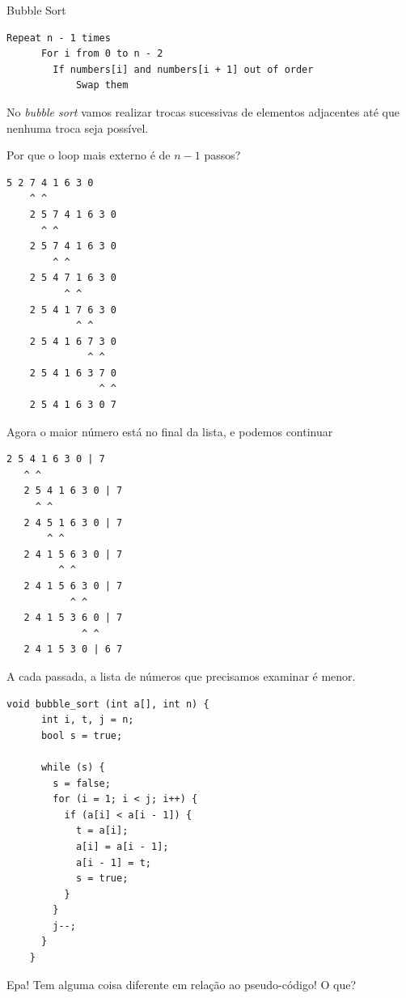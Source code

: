 \documentclass{beamer}
\begin{document}
\begin{frame}{Bubble Sort}

  \begin{lstlisting}[style=code]
    Repeat n - 1 times
      For i from 0 to n - 2
        If numbers[i] and numbers[i + 1] out of order
            Swap them
  \end{lstlisting}

  No \emph{bubble sort} vamos realizar trocas sucessivas de elementos
  adjacentes até que nenhuma troca seja possível.

  Por que o loop mais externo é de $n - 1$ passos?

  \framebreak

  \begin{lstlisting}[style=code]
    5 2 7 4 1 6 3 0
    ^ ^
    2 5 7 4 1 6 3 0
      ^ ^
    2 5 7 4 1 6 3 0
        ^ ^
    2 5 4 7 1 6 3 0
          ^ ^
    2 5 4 1 7 6 3 0
            ^ ^
    2 5 4 1 6 7 3 0
              ^ ^
    2 5 4 1 6 3 7 0
                ^ ^
    2 5 4 1 6 3 0 7
  \end{lstlisting}

  \framebreak

  Agora o maior número está no final da lista, e podemos continuar 

  \begin{lstlisting}[style=code]
   2 5 4 1 6 3 0 | 7
   ^ ^
   2 5 4 1 6 3 0 | 7
     ^ ^
   2 4 5 1 6 3 0 | 7
       ^ ^
   2 4 1 5 6 3 0 | 7
         ^ ^
   2 4 1 5 6 3 0 | 7
           ^ ^
   2 4 1 5 3 6 0 | 7
             ^ ^
   2 4 1 5 3 0 | 6 7
  \end{lstlisting}
  
  A cada passada, a lista de números que precisamos examinar é menor.

  \framebreak

  \begin{lstlisting}[style=normalc,caption=bubble.c]
    void bubble_sort (int a[], int n) {
      int i, t, j = n;
      bool s = true;
      
      while (s) {
        s = false;
        for (i = 1; i < j; i++) {
          if (a[i] < a[i - 1]) {
            t = a[i];
            a[i] = a[i - 1];
            a[i - 1] = t;
            s = true;
          }
        }
        j--;
      }
    }
  \end{lstlisting}

  \framebreak

  Epa! Tem alguma coisa diferente em relação ao pseudo-código! O que?


\end{frame}
\end{document}
